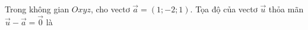 \begin{ex}
Trong không gian $Oxyz$, cho vectơ $\vec a=(1;-2;1)$. Tọa độ của vectơ $\vec u$ thỏa mãn $\vec u-\vec a=\vec 0$ là
\end{ex}
